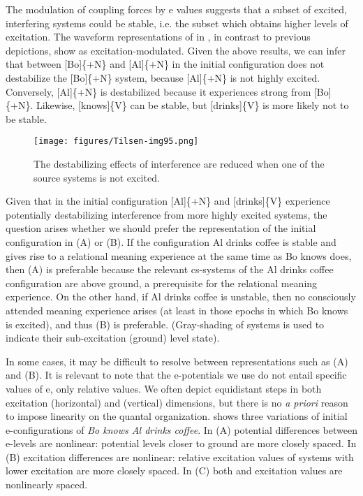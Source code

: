   The modulation of coupling forces by e values suggests that a subset of excited, interfering systems could be stable, i.e. the subset which obtains higher levels of excitation. The waveform representations of  in {}, in contrast to previous depictions, show  as excitation-modulated. Given the above results, we can infer that  between [Bo]\{+N\} and [Al]\{+N\} in the initial configuration does not destabilize the [Bo]\{+N\} system, because [Al]\{+N\} is not highly excited. Conversely, [Al]\{+N\} is destabilized because it experiences strong  from [Bo]\{+N\}. Likewise, [knows]\{V\} can be stable,  but [drinks]\{V\} is more likely not to be stable. 

\begin{figure}[t]
\texttt{[image: figures/Tilsen-img95.png]}
\caption{The destabilizing effects of interference are reduced when one of the source systems is not excited.}
\label{fig:4:45}
\end{figure}
  
  Given that in the initial configuration [Al]\{+N\} and [drinks]\{V\} experience potentially destabilizing interference from more highly excited systems, the question arises whether we should prefer the representation of the initial configuration in {}(A) or (B). If the configuration {\textbar}Al drinks coffee{\textbar} is stable and gives rise to a relational meaning experience at the same time as {\textbar}Bo knows{\textbar} does, then (A) is preferable because the relevant cs-systems of the {\textbar}Al drinks coffee{\textbar} configuration are above ground, a prerequisite for the relational meaning experience. On the other hand, if {\textbar}Al drinks coffee{\textbar} is unstable, then no consciously attended meaning experience arises (at least in those epochs in which {\textbar}Bo knows{\textbar} is excited), and thus (B) is preferable. (Gray-shading of systems is used to indicate their sub-excitation (ground) level state).

   In some cases, it may be difficult to resolve between representations such as (A) and (B). It is relevant to note that the e-potentials we use do not entail specific values of e, only relative values. We often depict equidistant steps in both excitation (horizontal) and  (vertical) dimensions, but there is no {\textit{a priori}} reason to impose linearity on the quantal organization. {} shows three variations of initial e-con\-fig\-u\-ra\-tions of \textit{Bo knows Al drinks coffee}. In (A) potential differences between e-levels are nonlinear: potential levels closer to ground are more closely spaced. In (B) excitation differences are nonlinear: relative excitation values of systems with lower excitation are more closely spaced. In (C) both  and excitation values are nonlinearly spaced.

